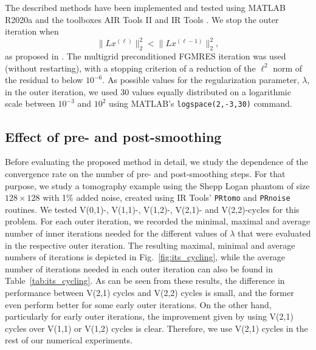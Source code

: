 The described methods have been implemented and tested using MATLAB R2020a and the toolboxes AIR Tools II \cite{art:HANS18} and IR Tools \cite{art:GAZZ19}. We stop the outer iteration when
\[
\|L x^{(\ell)}\|_2^2 < \|L x^{(\ell-1)}\|_2^2,
\]
as proposed in \cite{Gazzola_etal_2020}. The multigrid preconditioned
FGMRES iteration was used (without restarting), with a stopping criterion of a reduction of the $\ell^2$ norm of the residual to below $10^{-6}$. As possible values for the regularization parameter, $\lambda$, in the outer iteration, we used 30 values equally distributed on a logarithmic scale between $10^{-3}$ and $10^{2}$ using MATLAB's \texttt{logspace(2,-3,30)} command.

\subsection{Effect of pre- and post-smoothing}
\label{ssec:relaxation_comparison}
Before evaluating the proposed method in detail, we study the dependence of the convergence rate on the number of pre- and post-smoothing steps. For that purpose, we study a tomography example using the Shepp Logan phantom of size $128 \times 128$ with 1\% added noise, created using IR Tools' \cite{art:GAZZ19} \texttt{PRtomo} and \texttt{PRnoise} routines. We tested V(0,1)-, V(1,1)-, V(1,2)-, V(2,1)- and V(2,2)-cycles for this problem. For each outer iteration, we recorded the minimal, maximal and average number of inner iterations needed for the different values of $\lambda$ that were evaluated in the respective outer iteration. The resulting maximal, minimal and average numbers of iterations is depicted in Fig.~\ref{fig:its_cycling}, while the average number of iterations needed in each outer iteration can also be found in Table~\ref{tab:its_cycling}. As can be seen from these results, the difference in performance between V(2,1) cycles and V(2,2) cycles is small, and the former even perform better for some early outer iterations.  On the other hand, particularly for early outer iterations, the improvement given by using V(2,1) cycles over V(1,1) or V(1,2) cycles is clear.   Therefore, we use V(2,1) cycles in the rest of our numerical experiments.
